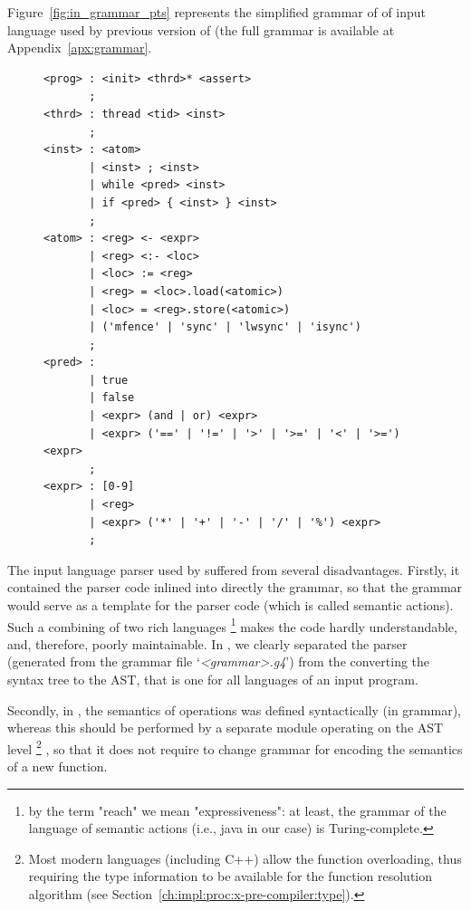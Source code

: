 Figure~\ref{fig:in_grammar_pts} represents the simplified grammar of of input language used by previous version of \porthos{} (the full  grammar is available at Appendix~\ref{apx:grammar}.

\begin{figure}[!h]%
\centering
\begin{lstlisting}[language=antlr,
                  basicstyle=\ttfamily\tiny,
                  caption={The sketch of the input language grammar used by \oldporthos},%
                  label={fig:in_grammar_pts}]
<prog> : <init> <thrd>* <assert>
       ;
<thrd> : thread <tid> <inst>
       ;
<inst> : <atom>
       | <inst> ; <inst>
       | while <pred> <inst>
       | if <pred> { <inst> } <inst>
       ;
<atom> : <reg> <- <expr>
       | <reg> <:- <loc>
       | <loc> := <reg>
       | <reg> = <loc>.load(<atomic>)
       | <loc> = <reg>.store(<atomic>)
       | ('mfence' | 'sync' | 'lwsync' | 'isync')
       ;
<pred> :
       | true
       | false
       | <expr> (and | or) <expr>
       | <expr> ('==' | '!=' | '>' | '>=' | '<' | '>=') <expr>
       ;
<expr> : [0-9]
       | <reg>
       | <expr> ('*' | '+' | '-' | '/' | '%') <expr>
       ;
\end{lstlisting}
\end{figure}

The input language parser used by \porthos{} suffered from several disadvantages.
Firstly, it contained the parser code inlined into directly the grammar, so that the grammar would serve as a template for the parser code (which is called semantic actions). Such a combining of two rich languages%
\footnote{by the term "reach" we mean "expressiveness": at least, the grammar of the language of semantic actions (i.e., java in our case) is Turing-complete.} %
makes the code hardly understandable, and, therefore, poorly maintainable. In \porthos[2], we clearly separated the parser (generated from the grammar file `\textit{<grammar>.g4}') from the converting the  syntax tree to the AST, that is one for all  languages of an input program.

Secondly, in \porthos{}, the semantics of operations was defined syntactically (in  grammar), whereas this should be performed by a separate module operating on the AST level%
\footnote{Most modern languages (including C++) allow the function overloading, thus requiring the type information to be available for the function resolution algorithm (see Section~\ref{ch:impl:proc:x-pre-compiler:type}).}%
, so that it does not require to change grammar for encoding the semantics of a new function. %

